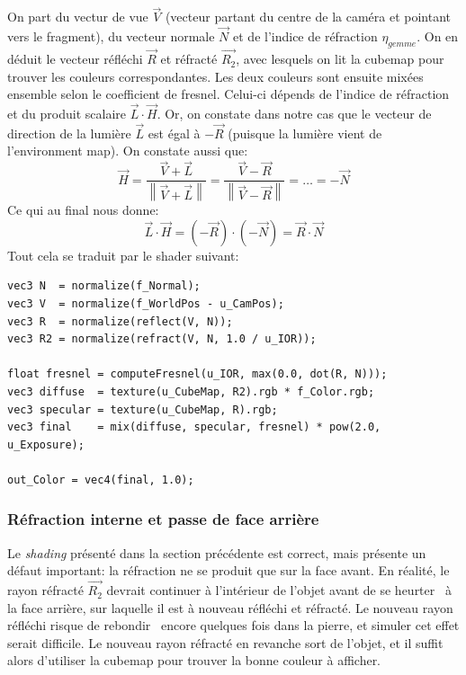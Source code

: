 \documentclass[a4paper,12pt]{article}
\newcommand{\svg}[2][0cm]{
    \begin{figure}[H]
        \centering
        \def\svgwidth{\columnwidth - #1}
        
    \end{figure}
}
\newcommand{\norm}[1]{\left\lVert#1\right\rVert}
\begin{document}
On part du vectur de vue $\overrightarrow{V}$ (vecteur partant du centre de la caméra et pointant vers le fragment), du vecteur
normale $\overrightarrow{N}$ et de l'indice de réfraction $\eta_{gemme}$. On en déduit le vecteur réfléchi $\overrightarrow{R}$
et réfracté $\overrightarrow{R_2}$, avec lesquels on lit la cubemap pour trouver les couleurs correspondantes. Les deux couleurs
sont ensuite mixées ensemble selon le coefficient de fresnel. Celui-ci dépends de l'indice de réfraction et du produit scalaire
$\overrightarrow{L}\cdot\overrightarrow{H}$. Or, on constate dans notre cas que le vecteur de direction de la lumière $\overrightarrow{L}$
est égal à $-\overrightarrow{R}$ (puisque la lumière vient de l'environment map). On constate aussi que:
\[
    \overrightarrow{H} = \frac{\overrightarrow{V} + \overrightarrow{L}}{\norm{\overrightarrow{V} + \overrightarrow{L}}}
    = \frac{\overrightarrow{V} - \overrightarrow{R}}{\norm{\overrightarrow{V} - \overrightarrow{R}}}
    = \ldots = -\overrightarrow{N}
\]
Ce qui au final nous donne:
\[
    \overrightarrow{L}\cdot\overrightarrow{H} = (-\overrightarrow{R})\cdot(-\overrightarrow{N}) = \overrightarrow{R}\cdot\overrightarrow{N}
\]
Tout cela se traduit par le shader suivant:
\begin{lstlisting}
vec3 N  = normalize(f_Normal);
vec3 V  = normalize(f_WorldPos - u_CamPos);
vec3 R  = normalize(reflect(V, N));
vec3 R2 = normalize(refract(V, N, 1.0 / u_IOR));

float fresnel = computeFresnel(u_IOR, max(0.0, dot(R, N)));
vec3 diffuse  = texture(u_CubeMap, R2).rgb * f_Color.rgb;
vec3 specular = texture(u_CubeMap, R).rgb;
vec3 final    = mix(diffuse, specular, fresnel) * pow(2.0, u_Exposure);

out_Color = vec4(final, 1.0);
\end{lstlisting}

\subsubsection{Réfraction interne et passe de face arrière}
Le \emph{shading} présenté dans la section précédente est correct, mais présente un défaut important: la réfraction ne se
produit que sur la face avant. En réalité, le rayon réfracté $\overrightarrow{R_2}$ devrait continuer à l'intérieur de l'objet
avant de se \og heurter \fg\ à la face arrière, sur laquelle il est à nouveau réfléchi et réfracté. Le nouveau rayon réfléchi
risque de \og rebondir \fg\ encore quelques fois dans la pierre, et simuler cet effet serait difficile. Le nouveau rayon réfracté
en revanche sort de l'objet, et il suffit alors d'utiliser la cubemap pour trouver la bonne couleur à afficher.
\svg[6cm]{refr_int}
\end{document}
